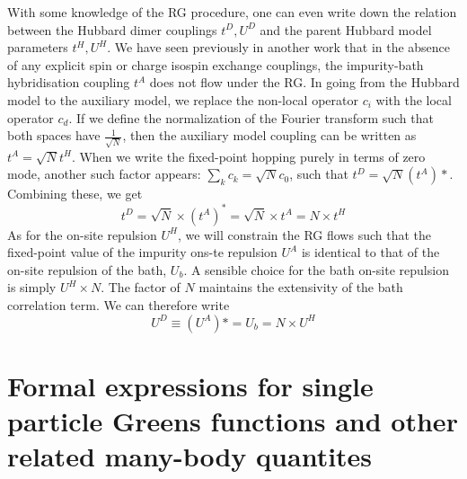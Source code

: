 \documentclass{article}
\numberwithin{equation}{section}
\begin{document}
With some knowledge of the RG procedure, one can even write down the relation between the Hubbard dimer couplings $t^D, U^D$ and the parent Hubbard model parameters $t^H, U^H$. We have seen previously in another work that in the absence of any explicit spin or charge isospin exchange couplings, the impurity-bath hybridisation coupling $t^A$ does not flow under the RG. In going from the Hubbard model to the auxiliary model, we replace the non-local operator $c_i$ with the local operator $c_d$. If we define the normalization of the Fourier transform such that both spaces have $\frac{1}{\sqrt N}$, then the auxiliary model coupling can be written as $t^A = \sqrt N t^H$. When we write the fixed-point hopping purely in terms of zero mode, another such factor appears: $\sum_k c_k = \sqrt N c_0$, such that $t^D = \sqrt N (t^A)*$. Combining these, we get
\[ t^D = \sqrt N \times (t^A)^* = \sqrt N \times t^A = N \times t^H \]
As for the on-site repulsion $U^H$, we will constrain the RG flows such that the fixed-point value of the impurity ons-te repulsion $U^A$ is identical to that of the on-site repulsion of the bath, $U_b$. A sensible choice for the bath on-site repulsion is simply $U^H\times N$. The factor of $N$ maintains the extensivity of the bath correlation term. We can therefore write
\[U^D \equiv (U^A)* = U_b = N \times U^H\]
\section{Formal expressions for single particle Greens functions and other related many-body quantites}
\end{document}
